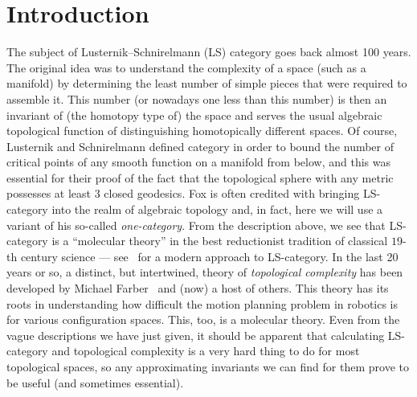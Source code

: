 \documentclass[amscd,amssymb,verbatim,11pt]{amsart}
\theoremstyle{plain}
\theoremstyle{definition}
\begin{document}

\maketitle
\tableofcontents

\section{Introduction}\label{sec:intro}
The subject of Lusternik--Schnirelmann (LS) category goes back almost 100 years.
The original idea was to understand the complexity of a space (such as a manifold)
by determining the least number of simple pieces that were required to 
assemble it. This number (or nowadays one less than this number) is then
an invariant of (the homotopy type of) the space and serves the usual algebraic
topological function of distinguishing homotopically different spaces. Of course,
Lusternik and Schnirelmann defined category in order to bound the number
of critical points of any smooth function on a manifold from below, and this was essential for their proof of the fact that the topological sphere with any metric
possesses at least 3 closed geodesics. Fox is often credited with bringing
LS-category into the realm of algebraic topology and, in fact, here we will
use a variant of his so-called \emph{one-category}. From the description above,
we see that LS-category is a ``molecular theory'' in the best reductionist 
tradition of classical $19$-th century science --- see~\cite{CLOT} for a modern
approach to LS-category. In the last 20 years or so,
a distinct, but intertwined, theory of \emph{topological complexity} has been
developed by Michael Farber~\cite{Fa} and (now) a host of others. This theory has its
roots in understanding how difficult the motion planning problem in robotics
is for various configuration spaces. This, too, is a molecular theory. Even from 
the vague descriptions we have just given, it should be apparent that
calculating LS-category and topological complexity is a very hard thing 
to do for most topological spaces, so any approximating invariants we can find for them prove to be useful (and sometimes essential).
\end{document}
